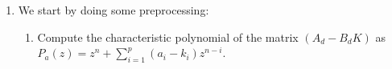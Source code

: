 \documentclass[runningheads,a4paper]{llncs}
\newcommand{\mat}[1]{\boldsymbol{#1}}
\begin{document}
\begin{enumerate}
\item 
  We start by doing some preprocessing:%
  \begin{enumerate}
\item Compute the characteristic polynomial of the matrix $(A_d-B_dK)$ as 
$P_a(z) = z^n+\sum_{i=1}^p{(a_i-k_i)z^{n-i}}$.





\end{enumerate}
\end{enumerate}
\end{document}
